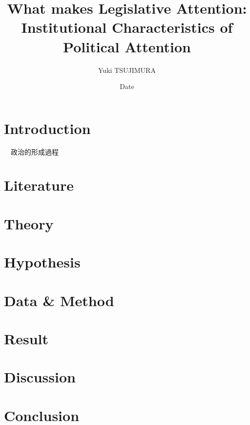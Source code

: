 \documentclass{article}
\title{What makes Legislative Attention: Institutional Characteristics of Political Attention}
\author{Yuki TSUJIMURA}
\date{Date}
\begin{document}
\maketitle

\section*{Introduction}
　政治的形成過程

\section*{Literature}

\section*{Theory}

\section*{Hypothesis}

\section*{Data \& Method}

\section*{Result}

\section*{Discussion}

\section*{Conclusion}


\end{document}
